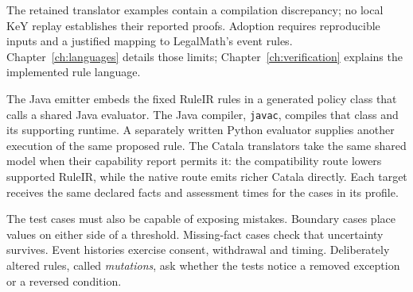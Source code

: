 \documentclass[12pt,a4paper,oneside,openany]{book}
\begin{document}
The retained translator examples contain a compilation discrepancy; no local
KeY replay establishes their reported proofs. Adoption requires reproducible
inputs and a justified mapping to LegalMath's event rules.
Chapter~\ref{ch:languages} details those limits; Chapter~\ref{ch:verification}
explains the implemented rule language.

\clearpage
{}
The Java emitter embeds the fixed RuleIR rules in a generated policy class
that calls a shared Java evaluator. The Java compiler, \texttt{javac}, compiles
that class and its supporting runtime. A separately written Python evaluator
supplies another execution of the same proposed rule. The Catala translators
take the same shared model when their capability report permits it: the
compatibility route lowers supported RuleIR, while the native route emits richer
Catala directly. Each target receives the same declared facts and assessment
times for the cases in its profile.

\begin{MapDiagram}
\end{MapDiagram}

The test cases must also be capable of exposing mistakes. Boundary cases place
values on either side of a threshold. Missing-fact cases check that uncertainty
survives. Event histories exercise consent, withdrawal and timing. Deliberately
altered rules, called \emph{mutations}, ask whether the tests notice a removed
exception or a reversed condition.
\end{document}

